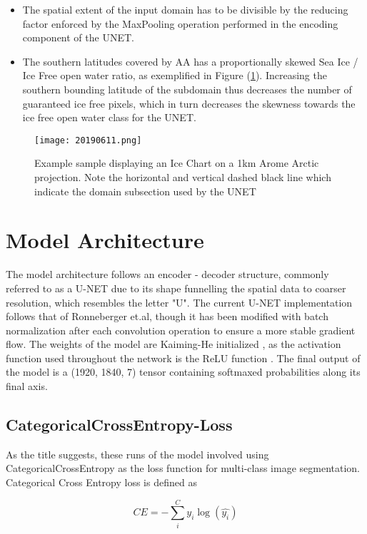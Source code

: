 \documentclass[../main/thesis]{subfiles}
\begin{document}
\begin{itemize}
    \item[1.] The spatial extent of the input domain has to be divisible by the reducing factor enforced by the MaxPooling operation performed in the encoding component of the UNET.
    \item[2.] The southern latitudes covered by AA has a proportionally skewed Sea Ice / Ice Free open water ratio, as exemplified in Figure (\ref{fig:exampleAAsouthborder}). Increasing the southern bounding latitude of the subdomain thus decreases the number of guaranteed ice free pixels, which in turn decreases the skewness towards the ice free open water class for the UNET.
\end{itemize}

\begin{figure}
    \texttt{[image: 20190611.png]}
    \caption{\label{fig:exampleAAsouthborder}Example sample displaying an Ice Chart on a 1km Arome Arctic projection. Note the horizontal and vertical dashed black line which indicate the domain subsection used by the UNET}
\end{figure}

\section{Model Architecture}
The model architecture follows an encoder - decoder structure, commonly referred to as a U-NET \cite{Ronneberger2015} due to its shape funnelling the spatial data to coarser resolution, which resembles the letter "U". The current U-NET implementation follows that of Ronneberger et.al, though it has been modified with batch normalization after each convolution operation to ensure a more stable gradient flow. The weights of the model are Kaiming-He initialized \cite{He2015}, as the activation function used throughout the network is the ReLU function \cite{Nair2010}. The final output of the model is a (1920, 1840, 7) tensor containing softmaxed probabilities along its final axis.

\subsection{CategoricalCrossEntropy-Loss}
As the title suggests, these runs of the model involved using CategoricalCrossEntropy as the loss function for multi-class image segmentation. Categorical Cross Entropy loss is defined as 

\begin{equation}
    \label{eq:CE}
    CE = - \sum_i^C y_i\log{(\hat{y_i})}
\end{equation}
\end{document}
